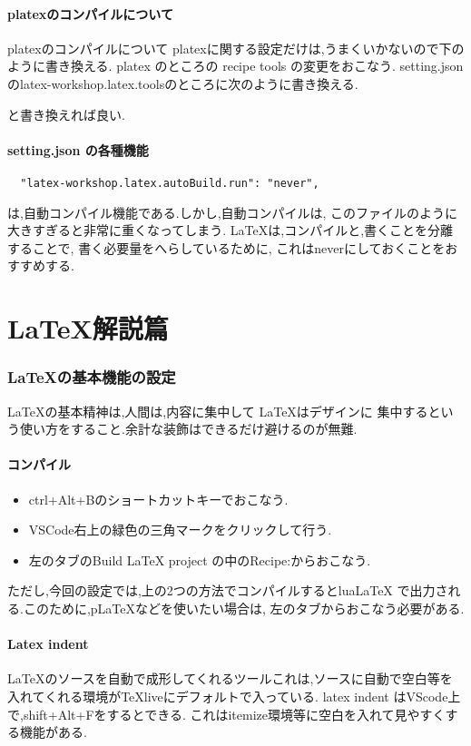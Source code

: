 \documentclass{ltjsarticle}
\begin{document}
\subsection{platexのコンパイルについて}
platexのコンパイルについて
platexに関する設定だけは,うまくいかないので下のように書き換える.
platex のところの
recipe tools の変更をおこなう.
setting.jsonのlatex-workshop.latex.toolsのところに次のように書き換える.

と書き換えれば良い.
\subsection{setting.json の各種機能}
\begin{verbatim}
  "latex-workshop.latex.autoBuild.run": "never",
\end{verbatim}
は,自動コンパイル機能である.しかし,自動コンパイルは,
このファイルのように大きすぎると非常に重くなってしまう.
\LaTeX は,コンパイルと,書くことを分離することで,
書く必要量をへらしているために,
これはneverにしておくことをおすすめする.

\part{\LaTeX 解説篇}
\section{\LaTeX の基本機能の設定}
\LaTeX の基本精神は,人間は,内容に集中して \LaTeX はデザインに
集中するという使い方をすること.余計な装飾はできるだけ避けるのが無難.
\subsection{コンパイル}
\begin{itemize}
  \item ctrl+Alt+Bのショートカットキーでおこなう.
  \item VSCode右上の緑色の三角マークをクリックして行う.
  \item 左のタブのBuild LaTeX project の中のRecipe:からおこなう.
\end{itemize}
ただし,今回の設定では,上の2つの方法でコンパイルするとlua\LaTeX
で出力される.このために,pLaTeXなどを使いたい場合は,
左のタブからおこなう必要がある.
\subsection{Latex indent}
LaTeXのソースを自動で成形してくれるツールこれは,ソースに自動で空白等を
入れてくれる環境がTeXliveにデフォルトで入っている.
latex indent はVScode上で,shift+Alt+Fをするとできる.
これはitemize環境等に空白を入れて見やすくする機能がある.
\end{document}
